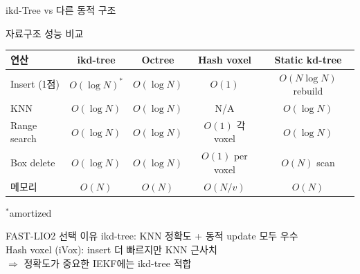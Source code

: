 \begin{frame}[shrink=10]{ikd-Tree vs 다른 동적 구조}
  \begin{block}{자료구조 성능 비교}
    \begin{center}
      \begin{tabular}{lcccc}
        \hline
        \textbf{연산} & \textbf{ikd-tree} & \textbf{Octree} & \textbf{Hash voxel} & \textbf{Static kd-tree} \\
        \hline
        Insert (1점) & $O(\log N)^*$ & $O(\log N)$ & $O(1)$ & $O(N\log N)$ rebuild \\
        KNN & $O(\log N)$ & $O(\log N)$ & N/A & $O(\log N)$ \\
        Range search & $O(\log N)$ & $O(\log N)$ & $O(1)$ 각 voxel & $O(\log N)$ \\
        Box delete & $O(\log N)$ & $O(\log N)$ & $O(1)$ per voxel & $O(N)$ scan \\
        메모리 & $O(N)$ & $O(N)$ & $O(N/v)$ & $O(N)$ \\
        \hline
      \end{tabular}
    \end{center}
    {\footnotesize $^*$amortized}
  \end{block}
  \pause
  \begin{alertblock}{FAST-LIO2 선택 이유}
    ikd-tree: KNN 정확도 + 동적 update 모두 우수\\
    Hash voxel (iVox): insert 더 빠르지만 KNN 근사치\\
    $\Rightarrow$ 정확도가 중요한 IEKF에는 ikd-tree 적합
  \end{alertblock}
\end{frame}

